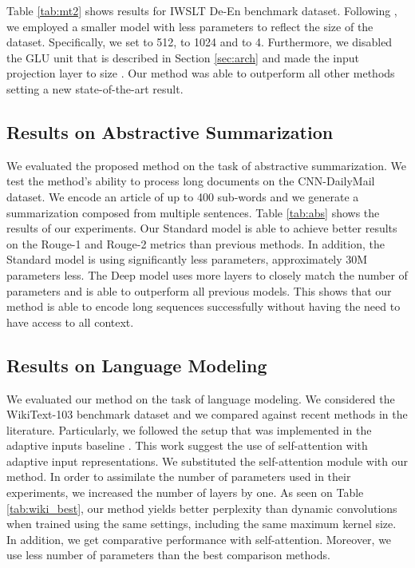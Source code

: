 \documentclass{article}
\def\wiki{WikiText-103}
\def\cnndm{CNN-DailyMail}
\def\iwslt{IWSLT De-En}
\begin{document}
Table \ref{tab:mt2} shows results for \iwslt{} benchmark dataset. Following \citet{wu2019pay}, we employed a smaller model with less parameters to reflect the size of the dataset. Specifically, we set  to 512,  to 1024 and  to 4. Furthermore, we disabled the GLU unit that is described in Section \ref{sec:arch} and made the input projection layer to size . Our method was able to outperform all other methods setting a new state-of-the-art result. 

\subsection{Results on Abstractive Summarization}
We evaluated the proposed method on the task of abstractive summarization. We test the method's ability to process long documents on the \cnndm{} dataset. We encode an article of up to 400 sub-words and we generate a summarization composed from multiple sentences. Table \ref{tab:abs} shows the results of our experiments. Our Standard model is able to achieve better results on the Rouge-1 and Rouge-2 metrics than previous methods. In addition, the Standard model is using significantly less parameters, approximately 30M parameters less. The Deep model uses more layers to closely match the number of parameters and is able to outperform all previous models. This shows that our method is able to encode long sequences successfully without having the need to have access to all context.

\subsection{Results on Language Modeling}
We evaluated our method on the task of language modeling. We considered the \wiki{} benchmark dataset and we compared against recent methods in the literature. Particularly, we followed the setup that was implemented in the adaptive inputs baseline \cite{DBLP:journals/corr/abs-1809-10853}. This work suggest the use of self-attention with adaptive input representations. We substituted the self-attention module with our method. In order to assimilate the number of parameters used in their experiments, we increased the number of layers by one. As seen on Table \ref{tab:wiki_best}, our method yields better perplexity than dynamic convolutions when trained using the same settings, including the same maximum kernel size. In addition, we get comparative performance with self-attention. Moreover, we use less number of parameters than the best comparison methods. 
\end{document}
